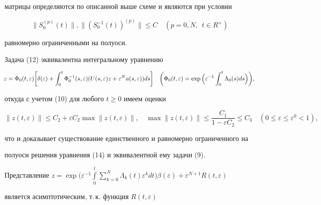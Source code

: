 матрицы определяются по описанной выше схеме и являются при условии


\begin{equation}


\|S_0^{(p)}(t) \|, \|(S_0^{-1}(t))^{(p)} \|\leq C


\quad (p=\overline{0,N},\ \ t\in R^+)


\end{equation}


равномерно ограниченными на полуоси.





Задача (12) эквивалентна интегральному уравнению


\begin{equation}


\negthickspace z=\Phi_0(t,\varepsilon)


\bigg[\delta(\varepsilon)+\int_0^t


\Phi_0^{-1}(s,\varepsilon)(U(s,\varepsilon)z+


\varepsilon^Na(s,\varepsilon))ds \bigg]\quad \bigg(\Phi_0(t,\varepsilon)=


\exp\Big(\varepsilon^{-1}\int_0^t\Lambda_0(s)ds\Big)\bigg),


\end{equation}


откуда с учетом (10) для любого $t\geq0$ имеем оценки


$$


\|z(t,\varepsilon) \| \leq C_2+\varepsilon C_2 \max


\|z(t,\varepsilon) \|,\quad \max \|z(t,\varepsilon) \|


\leq \frac{C_1}{1-\varepsilon C_2}\leq C_3 \quad(0\leq \varepsilon\leq


\varepsilon^0< 1),


$$


что и доказывает существование единственного и равномерно ограниченного на 


полуоси решения уравнения (14) и эквивалентной ему задачи (9).





Представление $z=\exp \Big(\varepsilon^{-1}\int\limits^{t}_{0}


\sum\limits^{N}_{k=0}\Lambda_k(t)\varepsilon^k dt\Big)\beta(\varepsilon)+


\varepsilon^{N+1} R(t,\varepsilon)$


является асимптотическим, т.\,к. функция $R(t,\varepsilon)$ 


